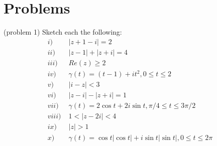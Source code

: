 \documentclass[handout]{ximera}
\begin{document}
\section{Problems}
\begin{problem}(problem 1)
Sketch each the following:\\
\begin{align*}
i) & \; |z+1-i| = 2 \\
ii) &  \; |z-1| + |z+i| = 4 \\
iii) & \;  Re(z) \geq 2 \\
iv) &  \; \gamma(t) = (t-1) + it^2, 0\leq t \leq 2 \\
v) &  \; |i- z| < 3 \\
vi) &  \; |z-i| - |z+i| = 1 \\
vii) & \;  \gamma(t) = 2\cos t + 2i\sin t , \pi/4 \leq t \leq 3\pi/2 \\
viii) &  \; 1 < |z -2i| < 4 \\
ix) & \;  |z| > 1 \\
x) &  \; \gamma(t) = \cos t |\cos t| + i\sin t |\sin t|, 0 \leq t \leq 2\pi
\end{align*}
\end{problem}
\end{document}
